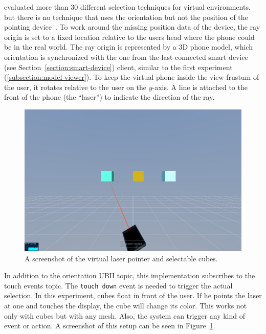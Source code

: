 \citeauthor{Argelaguet.2013} evaluated more than 30 different selection techniques for virtual environments, but there is no technique that uses the orientation but not the position of the pointing device~\cite[Table 1]{Argelaguet.2013}. To work around the missing position data of the device, the ray origin is set to a fixed location relative to the users head where the phone could be in the real world. The ray origin is represented by a \ac{3D} phone model, which orientation is synchronized with the one from the last connected smart device (see Section~\ref{section:smart-device}) client, similar to the first experiment (\ref{subsection:model-viewer}). To keep the virtual phone inside the view frustum of the user, it rotates relative to the user on the \(y\)-axis.
A line is attached to the front of the phone (the \enquote{laser}) to indicate the direction of the ray.

\begin{figure}[H]
  \centering
  \includegraphics[width=12cm]{figures/implementation/screenshot_exp_lp.png}
  \caption[Screenshot of the laser pointer experiment]{A screenshot of the virtual laser pointer and selectable cubes.}\label{fig:screenshot-exp-lp}
\end{figure}

In addition to the orientation \ac{UBII} topic, this implementation subscribes to the touch events topic. The \lstinline{touch down} event is needed to trigger the actual selection.
In this experiment, cubes float in front of the user. If he points the laser at one and touches the display, the cube will change its color. This works not only with cubes but with any mesh. Also, the system can trigger any kind of event or action. A screenshot of this setup can be seen in Figure~\ref{fig:screenshot-exp-lp}.


